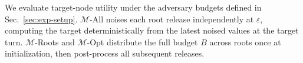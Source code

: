 We evaluate target-node utility under the adversary budgets defined in Sec.~\ref{sec:exp-setup}. $\mathcal{M}$-All noises each root release independently at $\varepsilon$, computing the target deterministically from the latest noised values at the target turn. $\mathcal{M}$-Roots and $\mathcal{M}$-Opt distribute the full budget $B$ across roots once at initialization, then post-process all subsequent releases.





